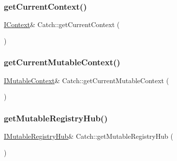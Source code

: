 \mbox{\label{namespace_catch_ad517cca9b21deb79101e90e5508dd161}} 
\subsubsection{\texorpdfstring{get\+Current\+Context()}{getCurrentContext()}}
{\footnotesize\ttfamily \hyperlink{struct_catch_1_1_i_context}{I\+Context}\& Catch\+::get\+Current\+Context (\begin{DoxyParamCaption}{ }\end{DoxyParamCaption})}

\mbox{\label{namespace_catch_af7bb0c32ab2453d2f53e92a96d15360e}} 
\subsubsection{\texorpdfstring{get\+Current\+Mutable\+Context()}{getCurrentMutableContext()}}
{\footnotesize\ttfamily \hyperlink{struct_catch_1_1_i_mutable_context}{I\+Mutable\+Context}\& Catch\+::get\+Current\+Mutable\+Context (\begin{DoxyParamCaption}{ }\end{DoxyParamCaption})}

\mbox{\label{namespace_catch_ac9ddcc6d66079add9cb2a3140b8ae51e}} 
\subsubsection{\texorpdfstring{get\+Mutable\+Registry\+Hub()}{getMutableRegistryHub()}}
{\footnotesize\ttfamily \hyperlink{struct_catch_1_1_i_mutable_registry_hub}{I\+Mutable\+Registry\+Hub}\& Catch\+::get\+Mutable\+Registry\+Hub (\begin{DoxyParamCaption}{ }\end{DoxyParamCaption})}

\mbox{\label{namespace_catch_ac24b072979540bfd922e7d46e899f46f}} 
